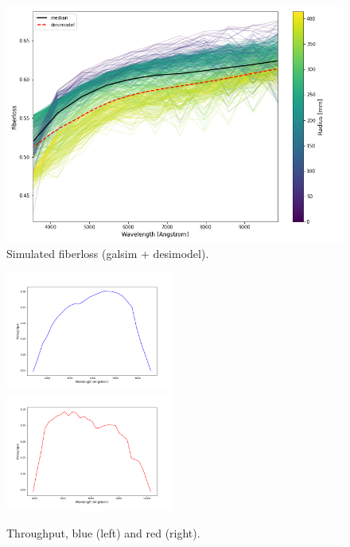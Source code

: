 \begin{figure}[h]
\centering
\includegraphics[width=14cm]{images/specsim/desimodel-qso-fiberloss.png}
\caption{Simulated fiberloss (galsim + desimodel).}
\label{fig:desimodel_qso_floss}
\end{figure}


\begin{figure}[h]
    \centering
    \includegraphics[width=0.495\textwidth]{images/specsim/throughput_blue.png}
    \includegraphics[width=0.495\textwidth]{images/specsim/throughput_red.png}
    \caption{Throughput, blue (left) and red (right).}
    \label{fig:throughput}
\end{figure}

